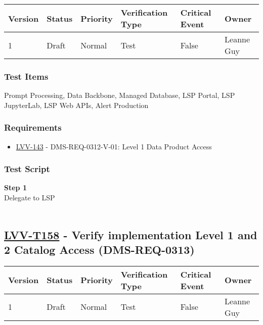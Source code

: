 \begin{longtable}[]{@{}llllll@{}}
\toprule
Version & Status & Priority & Verification Type & Critical Event &
Owner\tabularnewline
\midrule
\endhead
1 & Draft & Normal & Test & False & Leanne Guy\tabularnewline
\bottomrule
\end{longtable}

\hypertarget{test-items-133}{%
\subsubsection{Test Items}\label{test-items-133}}

Prompt Processing, Data Backbone, Managed Database, LSP Portal, LSP
JupyterLab, LSP Web APIs, Alert Production

\hypertarget{requirements-134}{%
\subsubsection{Requirements}\label{requirements-134}}

\begin{itemize}
\tightlist
\item
  \href{https://jira.lsstcorp.org/browse/LVV-143}{LVV-143} -
  DMS-REQ-0312-V-01: Level 1 Data Product Access
\end{itemize}

\hypertarget{test-script-134}{%
\subsubsection{Test Script}\label{test-script-134}}

\textbf{Step 1}\\
Delegate to LSP\\
~\\

\hypertarget{lvv-t158---verify-implementation-level-1-and-2-catalog-access-dms-req-0313}{%
\subsection{\texorpdfstring{\href{https://jira.lsstcorp.org/secure/Tests.jspa\#/testCase/LVV-T158}{LVV-T158}
- Verify implementation Level 1 and 2 Catalog Access
(DMS-REQ-0313)}{LVV-T158 - Verify implementation Level 1 and 2 Catalog Access (DMS-REQ-0313)}}\label{lvv-t158---verify-implementation-level-1-and-2-catalog-access-dms-req-0313}}

\begin{longtable}[]{@{}llllll@{}}
\toprule
Version & Status & Priority & Verification Type & Critical Event &
Owner\tabularnewline
\midrule
\endhead
1 & Draft & Normal & Test & False & Leanne Guy\tabularnewline
\bottomrule
\end{longtable}

